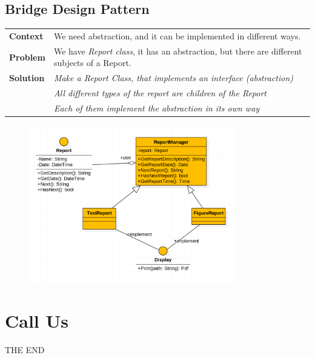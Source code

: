 \documentclass{article}
\begin{document}
\subsection{Bridge Design Pattern}
    \begin{tabular}{ l | l }
    \toprule
      \rowcolor{LightCyan}
      \textbf{Context}            & We need abstraction, and it can be implemented in different ways.\\
      \textbf{Problem}            & We have \textit{Report class}, it has an abstraction, but there are different subjects of a Report.\\
      \rowcolor{LightCyan}
      \textbf{Solution}           & \textit{Make a Report Class, that implements an interface (abstraction)}\\
                                  & \textit{All different types of the report are children of the Report}\\
                                  & \textit{Each of them implement the abstraction in its own way}\\
    \toprule
    \end{tabular}
\begin{figure}[ht!]
\centering
\includegraphics[width=90mm]{Bridge Design Pattern.png}
\end{figure}










\section{Call Us}
THE END
\end{document}
